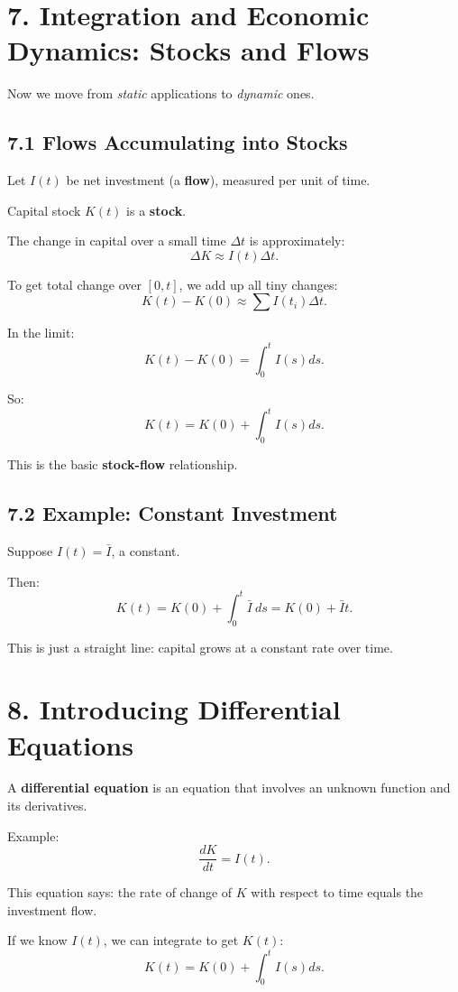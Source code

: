\documentclass[12pt]{article}
\begin{document}
\section*{7. Integration and Economic Dynamics: Stocks and Flows}

Now we move from \emph{static} applications to \emph{dynamic} ones.

\subsection*{7.1 Flows Accumulating into Stocks}

Let $I(t)$ be net investment (a \textbf{flow}), measured per unit of time.  

Capital stock $K(t)$ is a \textbf{stock}.

The change in capital over a small time $\Delta t$ is approximately:
\[
\Delta K \approx I(t)\Delta t.
\]

To get total change over $[0,t]$, we add up all tiny changes:
\[
K(t) - K(0) \approx \sum I(t_i)\Delta t.
\]

In the limit:
\[
K(t) - K(0) = \int_0^t I(s)ds.
\]

So:
\[
\boxed{K(t) = K(0) + \int_0^t I(s)ds.}
\]

This is the basic \textbf{stock-flow} relationship.

\subsection*{7.2 Example: Constant Investment}

Suppose $I(t) = \bar{I}$, a constant.

Then:
\[
K(t) = K(0) + \int_0^t \bar{I}\ ds = K(0) + \bar{I} t.
\]

This is just a straight line: capital grows at a constant rate over time.
\newpage
\section*{8. Introducing Differential Equations}

A \textbf{differential equation} is an equation that involves an unknown function and its derivatives.

Example:
\[
\frac{dK}{dt} = I(t).
\]

This equation says: the rate of change of $K$ with respect to time equals the investment flow.

If we know $I(t)$, we can integrate to get $K(t)$:
\[
K(t)=K(0)+\int_0^t I(s)ds.
\]
\end{document}

